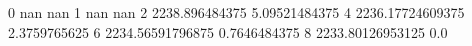 0 nan nan
1 nan nan
2 2238.896484375 5.09521484375
4 2236.17724609375 2.3759765625
6 2234.56591796875 0.7646484375
8 2233.80126953125 0.0
